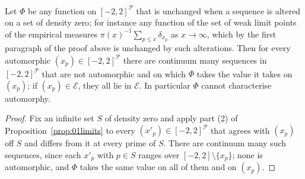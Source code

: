 \begin{corollary}\label{cor:01functional}
Let $\Phi$ be any function on $[-2,2]^{\mathcal P}$ that is unchanged when a sequence is altered on a set of density zero; for instance any function of the set of weak limit points of the empirical measures $\pi(x)^{-1}\sum_{p\le x}\delta_{x_p}$ as $x\to\infty$, which by the first paragraph of the proof above is unchanged by such alterations. Then for every automorphic $(x_p)\in[-2,2]^{\mathcal P}$ there are continuum many sequences in $[-2,2]^{\mathcal P}$ that are not automorphic and on which $\Phi$ takes the value it takes on $(x_p)$; if $(x_p)\in\mathcal E$, they all lie in $\mathcal E$. In particular $\Phi$ cannot characterise automorphy.
\end{corollary}

\begin{proof}
Fix an infinite set $S$ of density zero and apply part (2) of Proposition~\ref{prop:01limits} to every $(x'_p)\in[-2,2]^{\mathcal P}$ that agrees with $(x_p)$ off $S$ and differs from it at every prime of $S$. There are continuum many such sequences, since each $x'_p$ with $p\in S$ ranges over $[-2,2]\setminus\{x_p\}$; none is automorphic, and $\Phi$ takes the same value on all of them and on $(x_p)$.
\end{proof}


